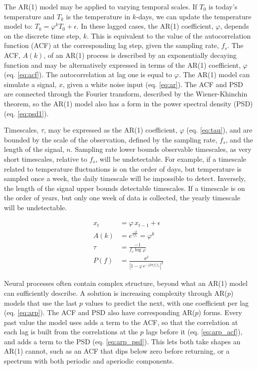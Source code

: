\documentclass[pdflatex,lineno,sn-nature]{sn-jnl}
\theoremstyle{thmstyleone}
\theoremstyle{thmstyletwo}
\theoremstyle{thmstylethree}
\begin{document}
The AR(1) model may be applied to varying temporal scales. If $T_0$ is today's temperature and $T_k$ is the temperature in $k$-days, we can update the temperature model to: $T_k = \varphi^k T_0 + \epsilon$. In these lagged cases, the AR(1) coefficient, $\varphi$, depends on the discrete time step, $k$. This is equivalent to the value of the autocorrelation function (ACF) at the corresponding lag step, given the sampling rate, $f_s$. The ACF, $A(k)$, of an AR(1) process is described by an exponentially decaying function and may be alternatively expressed in terms of the AR(1) coefficient, $\varphi$ (eq. \ref{eq:acf}). The autocorrelation at lag one is equal to $\varphi$. The AR(1) model can simulate a signal, $x$, given a white noise input (eq. \ref{eq:ar}). The ACF and PSD are connected through the Fourier transform, described by the Wiener-Khinchin theorem, so the AR(1) model also has a form in the power spectral density (PSD) (eq. \ref{eq:psd1}).

Timescales, $\tau$, may be expressed as the AR(1) coefficient, $\varphi$ (eq. \ref{eq:tau}), and are bounded by the scale of the observation, defined by the sampling rate, $f_s$, and the length of the signal, $n$. Sampling rate lower bounds observable timescales, as very short timescales, relative to $f_s$, will be undetectable. For example, if a timescale related to temperature fluctuations is on the order of days, but temperature is sampled once a week, the daily timescale will be impossible to detect. Inversely, the length of the signal upper bounds detectable timescales. If a timescale is on the order of years, but only one week of data is collected, the yearly timescale will be undetectable.

\begin{align}
x_t &= \varphi\, x_{t-1} + \epsilon \label{eq:ar} \\
A(k) &= e^{\frac{-k}{\tau f_s}} = \varphi^k \label{eq:acf} \\
\tau &= \frac{-1}{f_s \log{\varphi}} \label{eq:tau} \\
P(f) &= \frac{\sigma^{2}}{\left|1 - \varphi\, e^{-j 2 \pi f / f_s}\right|^{2}} \label{eq:psd1}
\end{align}

Neural processes often contain complex structure, beyond what an AR(1) model can sufficiently describe. A solution is increasing complexity through AR($p$) models that use the last $p$ values to predict the next, with one coefficient per lag (eq. \ref{eq:arp}). The ACF and PSD also have corresponding AR($p$) forms. Every past value the model uses adds a term to the ACF, so that the correlation at each lag is built from the correlations at the $p$ lags before it (eq. \ref{eq:arp_acf}), and adds a term to the PSD (eq. \ref{eq:arp_psd}). This lets both take shapes an AR(1) cannot, such as an ACF that dips below zero before returning, or a spectrum with both periodic and aperiodic components.
\end{document}
